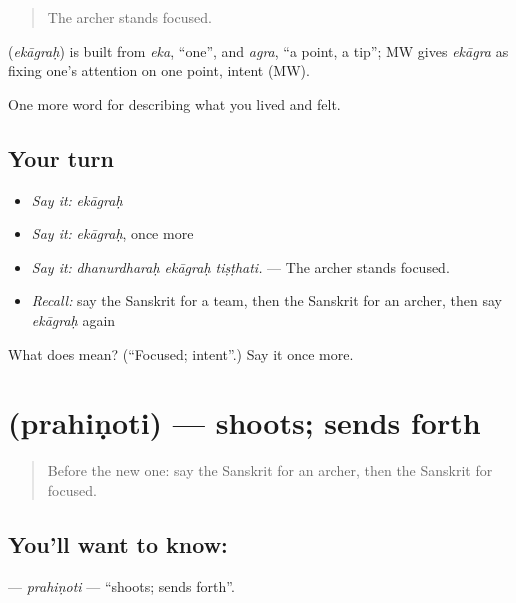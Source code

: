 \begin{quote}
The archer stands focused.
\end{quote}

\begin{cousinweb}
\textbf{} (\emph{ekāgraḥ}) is built from \emph{eka}, \textquotedblleft{}one\textquotedblright{}, and \emph{agra}, \textquotedblleft{}a point, a tip\textquotedblright{}; MW gives \emph{ekāgra} as fixing one's attention on one point, intent (MW).
\end{cousinweb}

\begin{grammarlens}[title={What you've built}]
One more word for describing what you lived and felt.
\end{grammarlens}

\subsection*{Your turn}
\begin{itemize}
\raggedright
  \item \emph{Say it:} \emph{ekāgraḥ}
  \item \emph{Say it:} \emph{ekāgraḥ}, once more
  \item \emph{Say it:} \emph{dhanurdharaḥ ekāgraḥ tiṣṭhati.} — The archer stands focused.
  \item \emph{Recall:} say the Sanskrit for a team, then the Sanskrit for an archer, then say \emph{ekāgraḥ} again
\end{itemize}

\begin{tcolorbox}[breakable,colback=teal!4,colframe=teal!35!black,title={Before you move on}]
What does  mean? (\textquotedblleft{}Focused; intent\textquotedblright{}.) Say it once more.
\end{tcolorbox}
\section[\texorpdfstring{\sk{प्रहिणोति} (prahiṇoti)}{प्रहिणोति (prahiṇoti)}]{ (prahiṇoti) — shoots; sends forth}

\label{lesson:SA-C527-prahinoti}



\begin{quote}
Before the new one: say the Sanskrit for an archer, then the Sanskrit for focused.
\end{quote}

\subsection*{You'll want to know: }
\textbf{} — \emph{prahiṇoti} — \textquotedblleft{}shoots; sends forth\textquotedblright{}.

